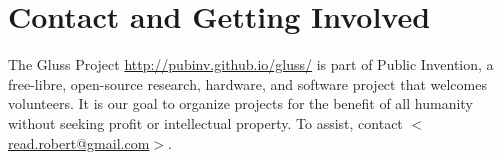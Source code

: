 \documentclass[11pt]{article}
\begin{document}
\section{Contact and Getting Involved}

The Gluss Project \url{http://pubinv.github.io/gluss/} is part of Public Invention,
a free-libre, open-source research, hardware, and software project that welcomes volunteers.
It is our goal to organize projects for the benefit of all humanity without seeking profit or intellectual property.
To assist, contact \href{mailto:read.robert@gmail.com}{$<$read.robert@gmail.com$>$}.



\end{document}
